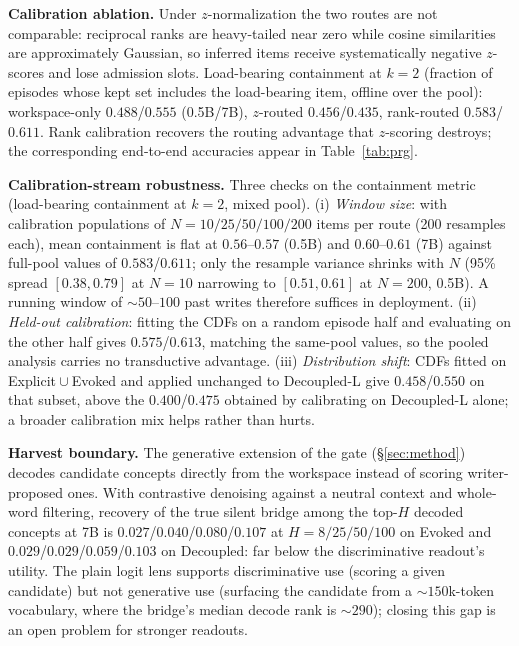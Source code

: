 \textbf{Calibration ablation.} Under $z$-normalization the two routes are not
comparable: reciprocal ranks are heavy-tailed near zero while cosine
similarities are approximately Gaussian, so inferred items receive
systematically negative $z$-scores and lose admission slots. Load-bearing
containment at $k{=}2$ (fraction of episodes whose kept set includes the
load-bearing item, offline over the pool): workspace-only $0.488$/$0.555$
(0.5B/7B), $z$-routed $0.456$/$0.435$, rank-routed $0.583$/$0.611$. Rank
calibration recovers the routing advantage that $z$-scoring destroys; the
corresponding end-to-end accuracies appear in Table~\ref{tab:prg}.

\textbf{Calibration-stream robustness.} Three checks on the containment metric
(load-bearing containment at $k{=}2$, mixed pool). (i) \emph{Window size}:
with calibration populations of $N{=}10/25/50/100/200$ items per route
(200 resamples each), mean containment is flat at $0.56$--$0.57$ (0.5B) and
$0.60$--$0.61$ (7B) against full-pool values of $0.583$/$0.611$; only the
resample variance shrinks with $N$ (95\% spread $[0.38, 0.79]$ at $N{=}10$
narrowing to $[0.51, 0.61]$ at $N{=}200$, 0.5B). A running window of
${\sim}50$--$100$ past writes therefore suffices in deployment.
(ii) \emph{Held-out calibration}: fitting the CDFs on a random episode half
and evaluating on the other half gives $0.575$/$0.613$, matching the
same-pool values, so the pooled analysis carries no transductive advantage.
(iii) \emph{Distribution shift}: CDFs fitted on Explicit${}\cup{}$Evoked and
applied unchanged to Decoupled-L give $0.458$/$0.550$ on that subset, above
the $0.400$/$0.475$ obtained by calibrating on Decoupled-L alone; a broader
calibration mix helps rather than hurts.

\textbf{Harvest boundary.} The generative extension of the gate
(\S\ref{sec:method}) decodes candidate concepts directly from the workspace
instead of scoring writer-proposed ones. With contrastive denoising against a
neutral context and whole-word filtering, recovery of the true silent bridge
among the top-$H$ decoded concepts at 7B is $0.027$/$0.040$/$0.080$/$0.107$ at
$H{=}8/25/50/100$ on Evoked and $0.029$/$0.029$/$0.059$/$0.103$ on Decoupled:
far below the discriminative readout's utility. The plain logit lens supports
discriminative use (scoring a given candidate) but not generative use
(surfacing the candidate from a ${\sim}150$k-token vocabulary, where the
bridge's median decode rank is ${\sim}290$); closing this gap is an open
problem for stronger readouts.

